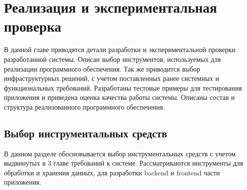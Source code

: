 \chapter{Реализация и экспериментальная проверка}

\begin{annotation}
	В данной главе приводятся детали разработки и экспериментальной проверки
	разработанной системы. Описан выбор инструментов, используемых для реализации
	программного обеспечения. Так же приводится выбор инфраструктурных решений,
	с учетом поставленных ранее системных и функциональных требований.
	Разработаны тестовые примеры для тестирования приложения
	и приведена оценка качества работы системы. Описаны состав и структура
	реализованного программного обеспечения.
\end{annotation}




\section{Выбор инструментальных средств}
\begin{annotation}
	В данном разделе обосновывается выбор инструментальных средств с учетом выдвинутых в 3
	главе требований к системе. Рассматриваются инструменты для обработки и хранения данных,
	для разработки backend и frontend части приложения.
\end{annotation}




